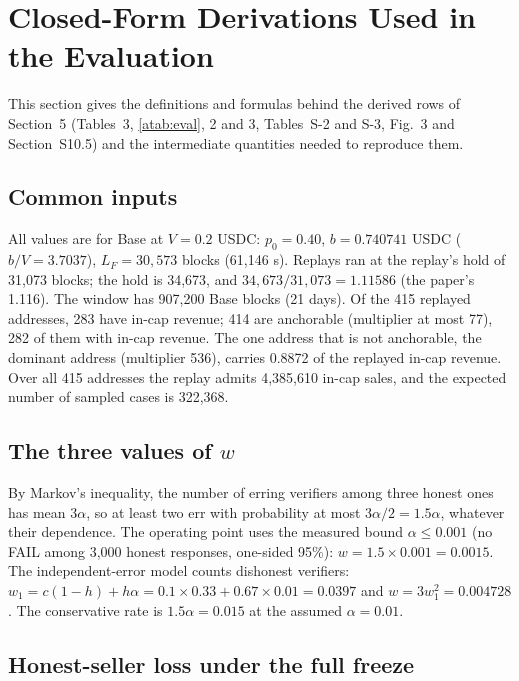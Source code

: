 \documentclass[10pt,a4paper]{article}
\theoremstyle{plain}
\theoremstyle{remark}
\begin{document}
\section{Closed-Form Derivations Used in the Evaluation}
\label{sec:s3}

This section gives the definitions and formulas behind the derived rows of Section~5 (Tables~3, \ref{atab:eval}, 2 and 3, Tables~S-2 and S-3, Fig.~3 and Section~S10.5) and the intermediate quantities needed to reproduce them.

\subsection{Common inputs}

All values are for Base at $V=0.2$ USDC: $p_0=0.40$, $b=0.740741$ USDC ($b/V=3.7037$), $L_F=30{,}573$ blocks (61,146 s). Replays ran at the replay's hold of 31,073 blocks; the hold is 34,673, and $34{,}673/31{,}073=1.11586$ (the paper's 1.116). The window has 907,200 Base blocks (21 days). Of the 415 replayed addresses, 283 have in-cap revenue; 414 are anchorable (multiplier at most 77), 282 of them with in-cap revenue. The one address that is not anchorable, the dominant address (multiplier 536), carries 0.8872 of the replayed in-cap revenue. Over all 415 addresses the replay admits 4,385,610 in-cap sales, and the expected number of sampled cases is 322,368.

\subsection{The three values of $w$}

By Markov's inequality, the number of erring verifiers among three honest ones has mean $3\alpha$, so at least two err with probability at most $3\alpha/2=1.5\alpha$, whatever their dependence. The operating point uses the measured bound $\alpha\le0.001$ (no FAIL among 3,000 honest responses, one-sided 95\%): $w=1.5\times0.001=0.0015$. The independent-error model counts dishonest verifiers: $w_1=c(1-h)+h\alpha=0.1\times0.33+0.67\times0.01=0.0397$ and $w=3w_1^2=0.004728$. The conservative rate is $1.5\alpha=0.015$ at the assumed $\alpha=0.01$.

\subsection{Honest-seller loss under the full freeze}
\end{document}
